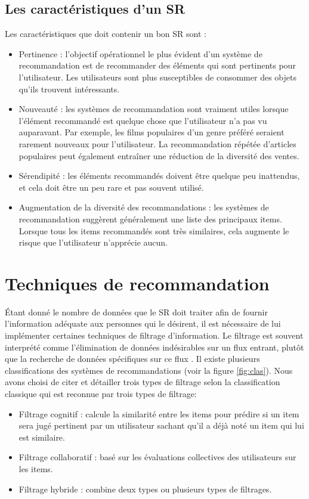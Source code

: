 \documentclass[a4paper,12pt,letterpaper,headsepline,singlespacing,headsepline, french]{report}
\begin{document}
\subsection{Les caractéristiques d’un SR}

Les caractéristiques que doit contenir un bon SR sont\cite{ref3} :
\begin{itemize}
\item Pertinence : l'objectif opérationnel le plus évident d'un système de recommandation est de recommander des éléments qui sont pertinents pour l'utilisateur. Les utilisateurs sont plus susceptibles de consommer des objets qu’ils trouvent intéressants. 
\item Nouveauté : les systèmes de recommandation sont vraiment utiles lorsque l'élément recommandé est quelque chose que l'utilisateur n'a pas vu auparavant. Par exemple, les films populaires d'un genre préféré seraient rarement nouveaux pour l'utilisateur. La recommandation répétée d'articles populaires peut également entraîner une réduction de la diversité des ventes.
\item Sérendipité : les éléments recommandés doivent être quelque peu inattendus, et cela doit être un peu rare et pas souvent utilisé.
\item Augmentation de la diversité des recommandations : les systèmes de recommandation suggèrent généralement une liste des principaux items. Lorsque tous les items recommandés sont très similaires, cela augmente le risque que l’utilisateur n’apprécie aucun.
\end{itemize}

\section{Techniques de recommandation}
Étant donné le nombre de données que le SR doit traiter afin de fournir l’information adéquate aux personnes qui le désirent, il est nécessaire de lui implémenter certaines techniques de filtrage d’information. 
Le filtrage est souvent interprété comme l’élimination de données indésirables sur un flux entrant, plutôt que la recherche de données spécifiques sur ce flux \cite{ref4}. 
Il existe plusieurs classifications des systèmes de recommandations (voir la figure \ref{fig:clas}). Nous avons choisi de citer et détailler trois types de filtrage selon la classification classique \cite{ref5} qui est reconnue par trois types de filtrage:
\begin{itemize}
	\item Filtrage cognitif : calcule la similarité entre les items pour prédire si un item sera jugé pertinent par un utilisateur sachant qu’il a déjà noté un item qui lui est similaire.
	\item Filtrage collaboratif : basé sur les évaluations collectives des utilisateurs sur les items.
	\item Filtrage hybride : combine deux types ou plusieurs types de filtrages.
\end{itemize}
\end{document}
